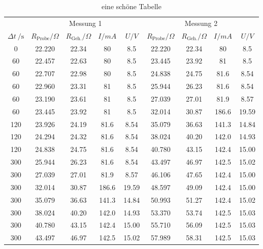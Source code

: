 \documentclass[captions=tableheading]{scrartcl}
\begin{document}
  \begin{table}
    \centering
    \caption{eine schöne Tabelle}
    \label{tab:tab}
    \begin{tabular}{c c c c c c c c c} %
      \toprule
      & \multicolumn{4}{c}{Messung 1}
      &\multicolumn{4}{c}{Messung 2} \\
      {$\Delta t\:/\si{\second}$} & {$R_\text{Probe}/\Omega$} & {$R_\text{Geh.}/\Omega$}
      & {$I/mA$}& {$U/V$} & {$R_\text{Probe}/\Omega$} & {$R_\text{Geh.}/\Omega$}
      & {$I/mA$}& {$U/V$}\\

      \midrule
      0 &  22.220 &  22.34 &  80   &  8.5  &   22.220 &  22.34 &  80   &  8.5 \\
     60 &  22.457 &  22.63 &  80   &  8.5  &   23.445 &  23.92 &  81   &  8.5 \\
     60 &  22.707 &  22.98 &  80   &  8.5  &   24.838 &  24.75 &  81.6 &  8.54 \\
     60 &  22.960 &  23.31 &  81   &  8.5  &   25.944 &  26.23 &  81.6 &  8.54 \\
     60 &  23.190 &  23.61 &  81   &  8.5  &   27.039 &  27.01 &  81.9 &  8.57 \\
     60 &  23.445 &  23.92 &  81   &  8.5  &   32.014 &  30.87 & 186.6 & 19.59 \\
    120 &  23.926 &  24.19 &  81.6 &  8.54 &   35.079 &  36.63 & 141.3 & 14.84 \\
    120 &  24.294 &  24.32 &  81.6 &  8.54 &   38.024 &  40.20 & 142.0 & 14.93 \\
    120 &  24.838 &  24.75 &  81.6 &  8.54 &   40.780 &  43.15 & 142.4 & 15.00 \\
    300 &  25.944 &  26.23 &  81.6 &  8.54 &   43.497 &  46.97 & 142.5 & 15.02 \\
    300 &  27.039 &  27.01 &  81.9 &  8.57 &   46.106 &  47.65 & 142.4 & 15.00 \\
    300 &  32.014 &  30.87 & 186.6 & 19.59 &   48.597 &  49.09 & 142.4 & 15.00 \\
    300 &  35.079 &  36.63 & 141.3 & 14.84 &   50.993 &  51.27 & 142.4 & 15.02 \\
    300 &  38.024 &  40.20 & 142.0 & 14.93 &   53.370 &  53.74 & 142.5 & 15.03 \\
    300 &  40.780 &  43.15 & 142.4 & 15.00 &   55.710 &  56.09 & 142.5 & 15.03 \\
    300 &  43.497 &  46.97 & 142.5 & 15.02 &   57.989 &  58.31 & 142.5 & 15.03 \\

\end{tabular}
\end{table}
\end{document}
